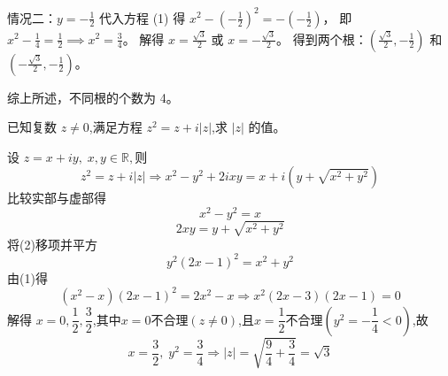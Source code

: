 \begin{questions}
\begin{solution}
情况二：$y = -\frac{1}{2}$
代入方程 (1) 得 $x^2 - (-\frac{1}{2})^2 = -(-\frac{1}{2})$，
即 $x^2 - \frac{1}{4} = \frac{1}{2} \implies x^2 = \frac{3}{4}$。
解得 $x = \frac{\sqrt{3}}{2}$ 或 $x = -\frac{\sqrt{3}}{2}$。
得到两个根：$(\frac{\sqrt{3}}{2}, -\frac{1}{2})$ 和 $(-\frac{\sqrt{3}}{2}, -\frac{1}{2})$。

综上所述，不同根的个数为 4。
\end{solution}
    
    \question 已知复数 \(z\ne 0\),满足方程 \(z^2=z+i|z|\),求 \(|z|\) 的值。
    \begin{solution}
        设 $z = x + iy,\;x,y\in \mathbb{R},$则
        \[
        z^2 = z + i|z| \Rightarrow x^2 - y^2 + 2ixy  = x + i\left(y + \sqrt{x^2 + y^2}\right)
        \]
        比较实部与虚部得
        \[
        x^2 - y^2 = x \tag{1}
        \]
        \[
        2xy = y + \sqrt{x^2 + y^2} \tag{2}
        \]
        将(2)移项并平方
        \[
        y^2(2x - 1)^2 = x^2 + y^2 
        \]
        由(1)得
        \[
        (x^2 - x)(2x - 1)^2 = 2x^2 - x \Rightarrow x^2(2x-3)(2x-1)=0
        \]
        解得 $x=0,\dfrac{1}{2},\dfrac{3}{2}$,其中$x=0$不合理$(z\neq 0)$,且$x=\dfrac{1}{2}$不合理$(y^2=-\dfrac{1}{4}<0)$,故
        \[
        x = \dfrac{3}{2},\; y^2 = \dfrac{3}{4}\Rightarrow|z| = \sqrt{\frac{9}{4} + \frac{3}{4}} = \sqrt3
        \]
    \end{solution}


\end{questions}
